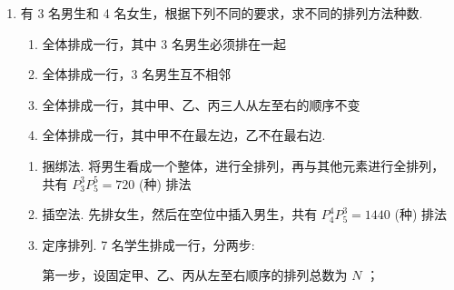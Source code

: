 \begin{enumerate}
\begin{enumerate}
\begin{enumerate}
            \item 全体排成一行，其中甲，乙，丙三人从左至右的顺序不变
        \end{enumerate}
        \begin{jieda}
            \begin{enumerate}
                \item 将女生看成一个整体，与3名男生在一起进行全排列，有 $P_{4}^{4}$ 种方法，再将 4 名女生进行全排列,也有 $P_{4}^{4}$ 种方法，故共有 $P_{4}^{4} \times  P_{4}^{4} = {576}$ 种排法.
                \item 男生不相邻，而女生不作要求，所以应先排女生，有 $P_{4}^{4}$ 种方法，再在女生之间及首尾空出的 5 个空位中任选 3 个空位排男生，有 $P_{5}^{3}$ 种方法，故共有 $P_{5}^{3} \times  P_{4}^{4} = {1440}$ 种排法.
                \item 从7个位置中选四个安排除甲，乙，丙以外的4个人，有 $P_{7}^{4}$ 种方法，剩下的三个位置从左至右依次安排甲，乙，丙，仅有一种安排，故共有 $P_{7}^{4} = {840}$ 种排法
            \end{enumerate}
        \end{jieda}
        \item 有 3 名男生和 4 名女生，根据下列不同的要求，求不同的排列方法种数.
        \begin{enumerate}
            \item 全体排成一行，其中 3 名男生必须排在一起
            \item 全体排成一行，3 名男生互不相邻
            \item 全体排成一行，其中甲、乙、丙三人从左至右的顺序不变
            \item 全体排成一行，其中甲不在最左边，乙不在最右边.
        \end{enumerate}
        \begin{jieda}
            \begin{enumerate}
                \item 捆绑法. 将男生看成一个整体，进行全排列，再与其他元素进行全排列，共有 $P_{3}^{3}P_{5}^{5} = {720}$ (种) 排法
                
                \item 插空法. 先排女生，然后在空位中插入男生，共有 $P_{4}^{4}P_{5}^{3} = {1440}$ (种) 排法
                
                \item 定序排列. 7 名学生排成一行，分两步:
                
                第一步，设固定甲、乙、丙从左至右顺序的排列总数为 $N$ ；
                

\end{enumerate}
\end{jieda}
\end{enumerate}
\end{enumerate}
